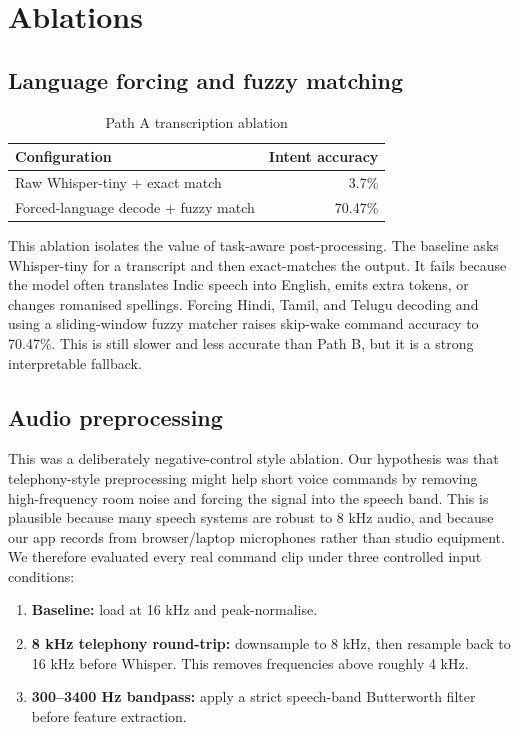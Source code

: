 \documentclass[11pt]{article}
\begin{document}
\section{Ablations}

\subsection{Language forcing and fuzzy matching}

\begin{table}[h]
\centering
\caption{Path A transcription ablation}
\begin{tabular}{lr}
\toprule
Configuration & Intent accuracy \\
\midrule
Raw Whisper-tiny + exact match & 3.7\% \\
Forced-language decode + fuzzy match & 70.47\% \\
\bottomrule
\end{tabular}
\end{table}

This ablation isolates the value of task-aware post-processing. The baseline
asks Whisper-tiny for a transcript and then exact-matches the output. It fails
because the model often translates Indic speech into English, emits extra
tokens, or changes romanised spellings. Forcing Hindi, Tamil, and Telugu
decoding and using a sliding-window fuzzy matcher raises skip-wake command
accuracy to 70.47\%. This is still slower and less accurate than Path B, but
it is a strong interpretable fallback.

\subsection{Audio preprocessing}

This was a deliberately negative-control style ablation. Our hypothesis was
that telephony-style preprocessing might help short voice commands by removing
high-frequency room noise and forcing the signal into the speech band. This is
plausible because many speech systems are robust to 8 kHz audio, and because
our app records from browser/laptop microphones rather than studio equipment.
We therefore evaluated every real command clip under three controlled input
conditions:

\begin{enumerate}[leftmargin=*]
\item \textbf{Baseline:} load at 16 kHz and peak-normalise.
\item \textbf{8 kHz telephony round-trip:} downsample to 8 kHz, then resample
back to 16 kHz before Whisper. This removes frequencies above roughly 4 kHz.
\item \textbf{300--3400 Hz bandpass:} apply a strict speech-band Butterworth
filter before feature extraction.
\end{enumerate}
\end{document}
